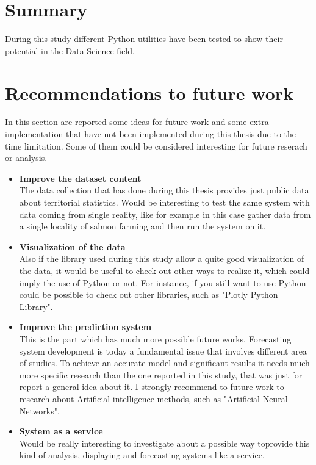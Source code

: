 
\section{Summary}
During this study different Python utilities have been tested to show their potential in the Data Science field. 
\newpage
\section{Recommendations to future work}
\vspace{-5mm}
In this section are reported some ideas for future work and some extra implementation that have not been implemented during this thesis due to the time limitation. Some of them could be considered interesting for future reserach or analysis.
\begin{itemize}
\item \textbf{Improve the dataset content}\\ The data collection that has done during this thesis provides just public data about territorial statistics. Would be interesting to test the same system with data coming from single reality, like for example in this case gather data from a single locality of salmon farming and then run the system on it.
\item \textbf{Visualization of the data}\\ Also if the library used during this study allow a quite good visualization of the data, it would be useful to check out other ways to realize it, which could imply the use of Python or not. For instance, if you still want to use Python could be possible to check out other libraries, such as "Plotly Python Library".
\item \textbf{Improve the prediction system}\\ This is the part which has much more possible future works. Forecasting system development is today a fundamental issue that involves different area of studies. To achieve an accurate model and significant results it needs much more specific research than the one reported in this study, that was just for report a general idea about it. I strongly recommend to future work to research about Artificial intelligence methods, such as "Artificial Neural Networks".
\item \textbf{System as a service}\\ Would be really interesting to investigate about a possible way toprovide this kind of analysis, displaying and forecasting systems like a service.
\end{itemize}









